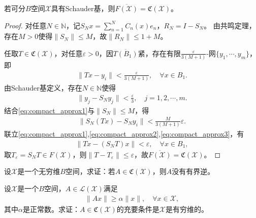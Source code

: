 \documentclass[../../main.tex]{subfiles}%
\begin{document}
\begin{theorem}
若可分$B$空间$\mathscr{X}$具有Schauder基，则$\overline{F(\mathscr{X})}=\mathfrak{C}(\mathscr{X})$。
\end{theorem}
\begin{proof}

对任意$N\in\mathbb{N}$，记$S_Nx=\sum\limits_{n=1}^{N}C_n(x)e_n$，$R_N=I-S_N$。
由共鸣定理，存在$M>0$使得$\|S_N\|\leqslant M$，故$\|R_N\|\leqslant1+M$。

任取$T\in\mathfrak{C}(\mathscr{X})$，对任意$\varepsilon>0$，因$\overline{T(B_1)}$紧，存在有限$\frac{\varepsilon}{3(M+1)}$-网$\{y_1,\cdots,y_m\}$，即
\begin{align}
\|Tx-y_i\|<\frac{\varepsilon}{3(M+1)},\quad \forall x\in B_1. \label{eq:compact_approx1}
\end{align}
由Schauder基定义，存在$N\in\mathbb{N}$使得
\begin{align}
\|y_j-S_Ny_j\|<\frac{\varepsilon}{3},\quad j=1,2,\cdots,m. \label{eq:compact_approx2}
\end{align}
结合\eqref{eq:compact_approx1}与$\|S_N\|\leqslant M$，得
\begin{align}
\|S_N(Tx)-S_Ny_i\|<\frac{M}{3(M+1)}\varepsilon. \label{eq:compact_approx3}
\end{align}
联立\eqref{eq:compact_approx1},\eqref{eq:compact_approx2},\eqref{eq:compact_approx3}，有
\begin{align*}
\|Tx-(S_NT)x\|<\varepsilon,\quad \forall x\in B_1,
\end{align*}
取$T_\varepsilon=S_NT\in F(\mathscr{X})$，则$\|T-T_\varepsilon\|\leqslant\varepsilon$，故$\overline{F(\mathscr{X})}=\mathfrak{C}(\mathscr{X})$。

\end{proof}

\begin{proposition}\label{proposition:无穷维空间上的紧算子没有有界逆}
设$\mathscr{X}$是一个无穷维$B$空间，求证：若$A\in\mathfrak{C}(\mathscr{X})$，则$A$没有有界逆。
\end{proposition}

\begin{example}
设$\mathscr{X}$是一个$B$空间，$A\in\mathscr{L}(\mathscr{X})$满足
\begin{align*}
\|Ax\|\geqslant\alpha\|x\|,\quad \forall x\in\mathscr{X},
\end{align*}
其中$\alpha$是正常数。求证：$A\in\mathfrak{C}(\mathscr{X})$的充要条件是$\mathscr{X}$是有穷维的。
\end{example}
\end{document}
